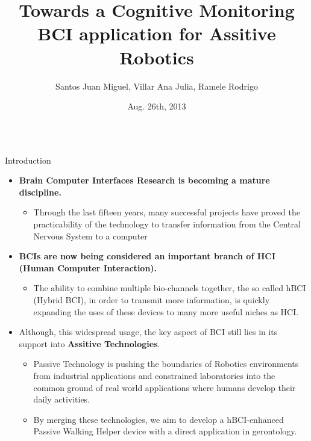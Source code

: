 \documentclass[final]{beamer}
\title{\huge Towards a Cognitive Monitoring BCI application for Assitive Robotics}
\author{Santos Juan Miguel, Villar Ana Julia,  Ramele Rodrigo}
\institute[Instituto Tecnológico de Buenos Aires]{Computer Engineering Department,Graduate School in Engineering, Buenos Aires, Argentina}
\date[Aug. 26th, 2013]{Aug. 26th, 2013}
\begin{document}
\begin{frame}

  \begin{columns}
    \begin{column}{.49\textwidth}       
            \begin{block}{Introduction}
              \begin{itemize}
              \item \textbf{Brain Computer Interfaces Research is becoming a mature discipline.}
                \begin{itemize}
                \item Through the last fifteen years, many successful projects have proved the practicability of the technology to transfer information from the Central Nervous System to a computer
                \end{itemize}
              \item \textbf{BCIs are now being considered an important branch of HCI (Human Computer Interaction).}
                \begin{itemize}
                \item The ability to combine multiple bio-channels together, the so called hBCI (Hybrid BCI), in order to transmit more information, is quickly expanding the uses of these devices to many more useful niches as HCI.
                \end{itemize}
              \item Although, this widespread usage, the key aspect of BCI still lies in its support into \textbf{Assitive Technologies}.   
                \begin{itemize}
                \item Passive Technology is pushing the boundaries of Robotics environments from industrial applications and constrained laboratories  into the common ground of real world applications where humans develop their daily activities. 
                \item By merging these technologies, we aim to develop a hBCI-enhanced  Passive Walking Helper device with a direct application in gerontology. 
                \end{itemize}
              \end{itemize}               
            \end{block}
            \vfill
    \end{column}


\end{columns}
\end{frame}
\end{document}
